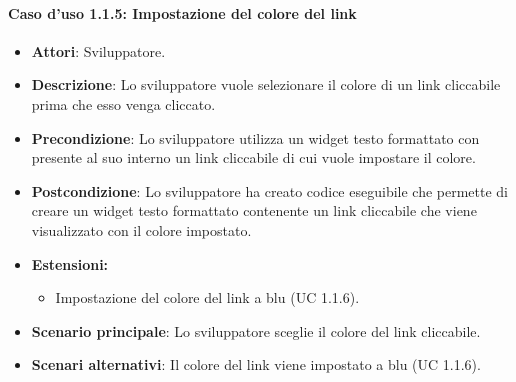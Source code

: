 \paragraph{Caso d'uso 1.1.5: Impostazione del colore del link}
\begin{itemize}
\item\textbf{Attori}: Sviluppatore.
\item\textbf{Descrizione}: Lo sviluppatore vuole selezionare il colore di un link cliccabile prima che esso venga cliccato.
\item\textbf{Precondizione}: Lo sviluppatore utilizza un widget testo formattato con presente al suo interno un link cliccabile di cui vuole impostare il colore.
\item\textbf{Postcondizione}: Lo sviluppatore ha creato codice eseguibile che permette di creare un widget testo formattato contenente un link cliccabile che viene visualizzato con il colore impostato.

\item\textbf{Estensioni:}
	\begin{itemize}
		\item Impostazione del colore del link a blu (UC 1.1.6).
	\end{itemize}
	
\item\textbf{Scenario principale}: Lo sviluppatore sceglie il colore del link cliccabile.
\item\textbf{Scenari alternativi}: Il colore del link viene impostato a blu (UC 1.1.6).
\end{itemize}